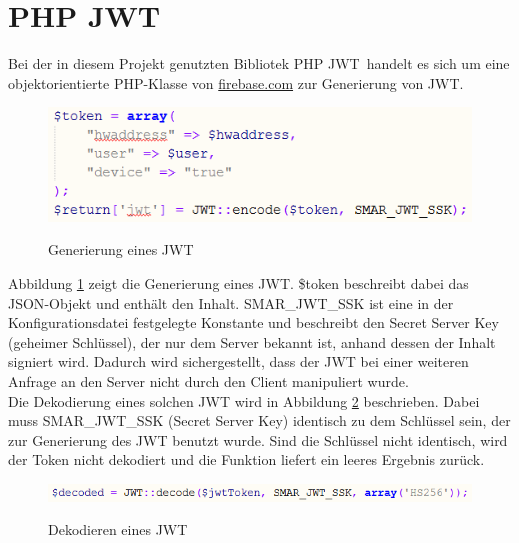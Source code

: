 \section{PHP JWT}
\label{cha:jwt}
\sloppy

Bei der in diesem Projekt genutzten Bibliotek \glqq PHP JWT\grqq\ handelt es sich um eine objektorientierte \ac{PHP}-Klasse von \mbox{\url{firebase.com}} zur Generierung von \acl{JWT}.
\fussy
\begin{figure}[H]
	\centering
	{\includegraphics[scale=1.0]{Bilder/jwt_encode.png}}
	\caption{Generierung eines \acs{JWT}}
	\label{fig:jwt_encode}
\end{figure}

Abbildung \ref{fig:jwt_encode} zeigt die Generierung eines \ac{JWT}. \$token beschreibt dabei das \ac{JSON}-Objekt und enthält den Inhalt. SMAR\_JWT\_SSK ist eine in der Konfigurationsdatei festgelegte Konstante und beschreibt den Secret Server Key (geheimer Schlüssel), der nur dem Server bekannt ist, anhand dessen der Inhalt signiert wird. Dadurch wird sichergestellt, dass der \ac{JWT} bei einer weiteren Anfrage an den Server nicht durch den Client manipuliert wurde.\\

Die Dekodierung eines solchen \acl{JWT} wird in Abbildung \ref{fig:jwt_decode} beschrieben. Dabei muss SMAR\_JWT\_SSK (Secret Server Key) identisch zu dem Schlüssel sein, der zur Generierung des \ac{JWT} benutzt wurde. Sind die Schlüssel nicht identisch, wird der Token nicht dekodiert und die Funktion liefert ein leeres Ergebnis zurück.

\begin{figure}[H]
	\centering
	{\includegraphics[scale=1.0]{Bilder/jwt_decode.png}}
	\caption{Dekodieren eines \acs{JWT}}
	\label{fig:jwt_decode}
\end{figure}

